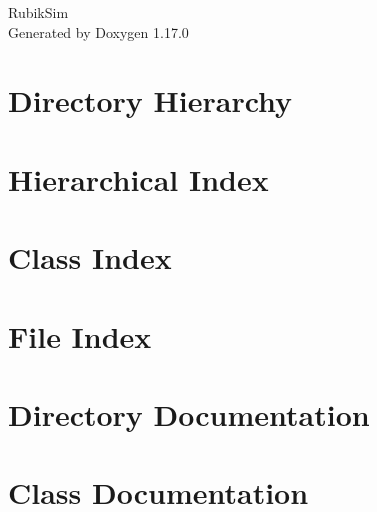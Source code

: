 \documentclass[twoside]{book}
\newcommand{\+}{\discretionary{\mbox{\scriptsize$\hookleftarrow$}}{}{}}
\newcommand{\clearemptydoublepage}{%
    \newpage{\pagestyle{empty}\cleardoublepage}%
  }
\begin{document}
  \raggedbottom
    \hypersetup{pageanchor=false,
                bookmarksnumbered=true,
                pdfencoding=unicode
               }
  \begin{titlepage}
  \vspace*{7cm}
  \begin{center}%
  {\Large Rubik\+Sim}\\
  \vspace*{1cm}
  {\large Generated by Doxygen 1.17.0}\\
  \end{center}
  \end{titlepage}
  \clearemptydoublepage
  \tableofcontents
  \clearemptydoublepage
  \hypersetup{pageanchor=true}
\chapter{Directory Hierarchy}

\chapter{Hierarchical Index}

\chapter{Class Index}

\chapter{File Index}

\chapter{Directory Documentation}






\chapter{Class Documentation}





















\end{document}

